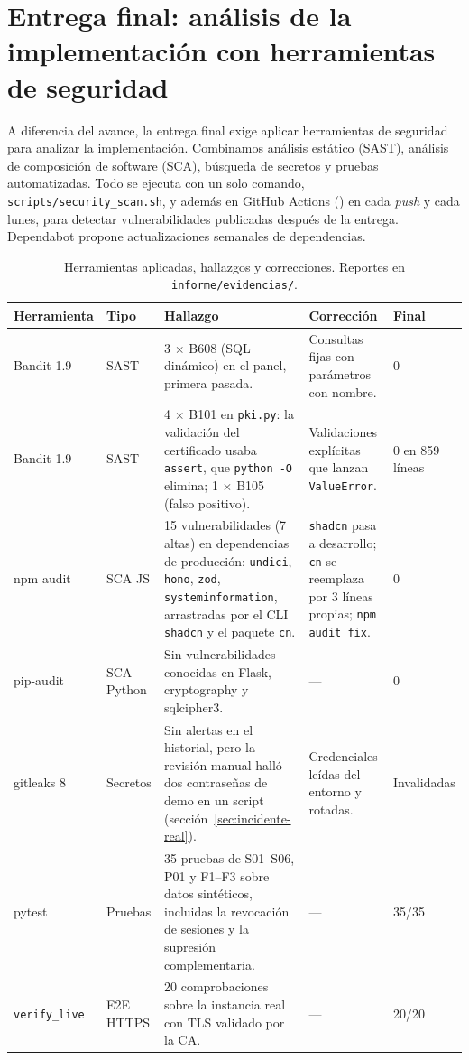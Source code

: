 \section{Entrega final: análisis de la implementación con herramientas de seguridad}
\label{sec:herramientas}
A diferencia del avance, la entrega final exige aplicar herramientas de seguridad para analizar la implementación. Combinamos análisis estático (SAST), análisis de composición de software (SCA), búsqueda de secretos y pruebas automatizadas. Todo se ejecuta con un solo comando, \texttt{scripts/security\_scan.sh}, y además en GitHub Actions () en cada \emph{push} y cada lunes, para detectar vulnerabilidades publicadas después de la entrega. Dependabot propone actualizaciones semanales de dependencias.

\begin{table}[H]
\centering\footnotesize
\begin{tabularx}{\textwidth}{P{2.2cm}P{1.6cm}Y Y P{1.5cm}}
\toprule
Herramienta & Tipo & Hallazgo & Corrección & Final\\
\midrule
Bandit 1.9 & SAST & 3 $\times$ B608 (SQL dinámico) en el panel, primera pasada. & Consultas fijas con parámetros con nombre. & 0\\
Bandit 1.9 & SAST & 4 $\times$ B101 en \texttt{pki.py}: la validación del certificado usaba \texttt{assert}, que \texttt{python -O} elimina; 1 $\times$ B105 (falso positivo). & Validaciones explícitas que lanzan \texttt{ValueError}. & 0 en 859 líneas\\
npm audit & SCA JS & 15 vulnerabilidades (7 altas) en dependencias de producción: \texttt{undici}, \texttt{hono}, \texttt{zod}, \texttt{systeminformation}, arrastradas por el CLI \texttt{shadcn} y el paquete \texttt{cn}. & \texttt{shadcn} pasa a desarrollo; \texttt{cn} se reemplaza por 3 líneas propias; \texttt{npm audit fix}. & 0\\
pip-audit & SCA Python & Sin vulnerabilidades conocidas en Flask, cryptography y sqlcipher3. & --- & 0\\
gitleaks 8 & Secretos & Sin alertas en el historial, pero la revisión manual halló dos contraseñas de demo en un script (sección~\ref{sec:incidente-real}). & Credenciales leídas del entorno y rotadas. & Invalidadas\\
pytest & Pruebas & 35 pruebas de S01--S06, P01 y F1--F3 sobre datos sintéticos, incluidas la revocación de sesiones y la supresión complementaria. & --- & 35/35\\
\texttt{verify\_live} & E2E HTTPS & 20 comprobaciones sobre la instancia real con TLS validado por la CA. & --- & 20/20\\
\bottomrule
\end{tabularx}
\caption{Herramientas aplicadas, hallazgos y correcciones. Reportes en \texttt{informe/evidencias/}.}
\label{tab:herramientas}
\end{table}

